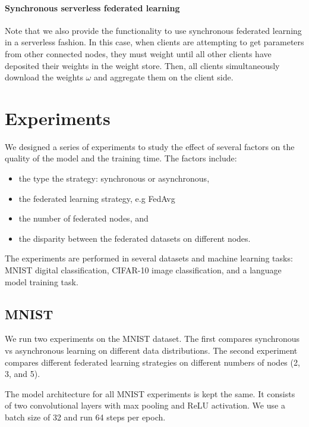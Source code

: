 \documentclass[twocolumn, switch]{article} %
\begin{document}
\paragraph{Synchronous serverless federated learning}

Note that we also provide the functionality to use synchronous federated learning in a serverless fashion. In this case, when clients are attempting to get parameters from other connected nodes, they must weight until all other clients have deposited their weights in the weight store. Then, all clients simultaneously download the weights $\omega$ and aggregate them on the client side. 

\section{Experiments}

We designed a series of experiments to study the effect of several factors on the quality of the model and the training time. The factors include:

\begin{itemize}
    \item the type the strategy: synchronous or asynchronous,
    \item the federated learning strategy, e.g FedAvg
    \item the number of federated nodes, and
    \item the disparity between the federated datasets on different nodes.
\end{itemize}

The experiments are performed in several datasets and machine learning tasks: MNIST digital classification, CIFAR-10 image classification, and a language model training task.

\subsection{MNIST}

We run two experiments on the MNIST dataset. The first compares synchronous vs asynchronous learning on different data distributions. The second experiment compares different federated learning strategies on different numbers of nodes (2, 3, and 5). 

The model architecture for all MNIST experiments is kept the same. It consists of two convolutional layers with max pooling and ReLU activation. We use a batch size of 32 and run 64 steps per epoch.
\end{document}
